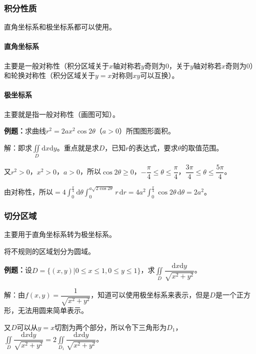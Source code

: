 \subsubsection{积分性质}

直角坐标系和极坐标系都可以使用。

\paragraph{直角坐标系} \leavevmode \medskip

主要是一般对称性（积分区域关于$x$轴对称若$y$奇则为0，关于$y$轴对称若$x$奇则为0）和轮换对称性（积分区域关于$y=x$对称则$xy$可以互换）。

\paragraph{极坐标系} \leavevmode \medskip

主要就是指一般对称性（画图可知）。

\textbf{例题：}求曲线$r^2=2ax^2\cos2\theta$（$a>0$）所围图形面积。

解：即求$\iint\limits_D\textrm{d}x\textrm{d}y$。重点就是求$D$，已知$r$的表达式，要求$\theta$的取值范围。

又$r^2>0$，$x^2>0$，$a>0$，所以$\cos2\theta\geqslant0$，$-\dfrac{\pi}{4}\leqslant\theta\leqslant\dfrac{\pi}{4}$，$\dfrac{3\pi}{4}\leqslant\theta\leqslant\dfrac{5\pi}{4}$。

由对称性，所以$=4\int_0^{\frac{\pi}{4}}\textrm{d}\theta\int_0^{a\sqrt{2\cos2\theta}}r\,\textrm{d}r=4a^2\int_0^{\frac{\pi}{4}}\cos2\theta\,\textrm{d}\theta=2a^2$。

\subsubsection{切分区域}

主要用于直角坐标系转为极坐标系。

将不规则的区域划分为圆域。

\textbf{例题：}设$D=\{(x,y)|0\leqslant x\leqslant1,0\leqslant y\leqslant1\}$，求$\displaystyle{\iint\limits_D\dfrac{\textrm{d}x\textrm{d}y}{\sqrt{x^2+y^2}}}$。

解：由$f(x,y)=\dfrac{1}{\sqrt{x^2+y^2}}$，知道可以使用极坐标系来表示，但是$D$是一个正方形，无法用圆来简单表示。

又$D$可以从$y=x$切割为两个部分，所以令下三角形为$D_1$，$\displaystyle{\iint\limits_D\dfrac{\textrm{d}x\textrm{d}y}{\sqrt{x^2+y^2}}}=2\displaystyle{\iint\limits_{D_1}\dfrac{\textrm{d}x\textrm{d}y}{\sqrt{x^2+y^2}}}$。

